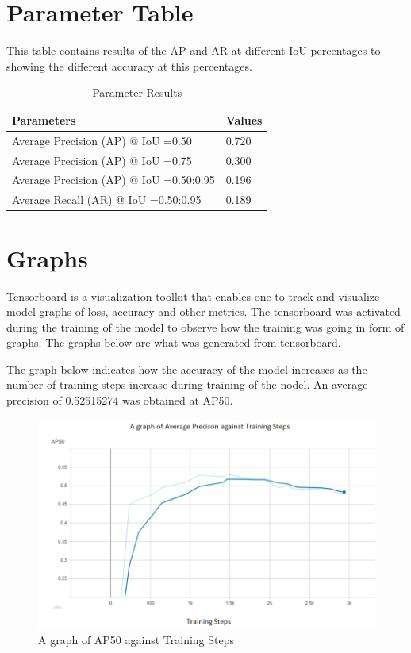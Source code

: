 \documentclass[12pt]{report}
\begin{document}
\begin{table}[H]
\section{Parameter Table}
This table contains results of the AP and AR at different IoU percentages to showing the different accuracy at this percentages.
\caption{Parameter Results} %
\centering %
    \begin{tabular}{| l | l |}
	 \hline\hline
    Parameters & Values \\ \hline
    Average Precision (AP) @ IoU =0.50 &  0.720 \\ \hline
    Average Precision (AP) @ IoU =0.75 &  0.300 \\ \hline
    Average Precision (AP) @ IoU =0.50:0.95 &  0.196 \\ \hline
    Average Recall (AR) @ IoU =0.50:0.95 &  0.189 \\ \hline
      		
\end{tabular}
\end{table}

\section{Graphs}
Tensorboard is a visualization toolkit that enables one to track and visualize model graphs of loss, accuracy and other metrics. The tensorboard was activated during the training of the model to observe how the training was going in form of graphs. The graphs below are what was generated from tensorboard.

The graph below indicates how the accuracy of the model increases as the number of training steps increase during training of the nodel. An average precision of 0.52515274 was obtained at AP50.
\begin{figure}[H]\includegraphics[scale=0.5]{AP50.png}\centering\caption{A graph of AP50 against Training Steps} \label{fig:AP50 against Training Steps} \end{figure}%
\end{document}
